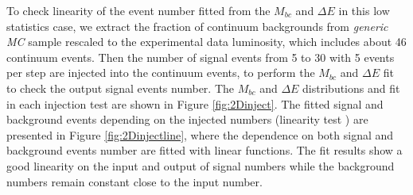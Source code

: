 To check linearity of the event number fitted from the $M_{bc}$ and $\Delta E$ in this low statistics case, we extract the fraction of continuum backgrounds from \textit{generic MC} sample rescaled to the experimental data luminosity, which includes about 46 continuum events. Then the number of signal events from 5 to 30 with 5 events per step are injected into the continuum events, to perform the $M_{bc}$ and $\Delta E$ fit to check the output signal events number. The $M_{bc}$ and $\Delta E$ distributions and fit in each injection test are shown in Figure \ref{fig:2Dinject}. The fitted signal and background events depending on the injected numbers (linearity test ) are presented in Figure \ref{fig:2Dinjectline}, where the dependence on both signal and background events number are fitted with linear functions. The fit results show a good linearity on the input and output of signal numbers while the background numbers remain constant close to the input number.

